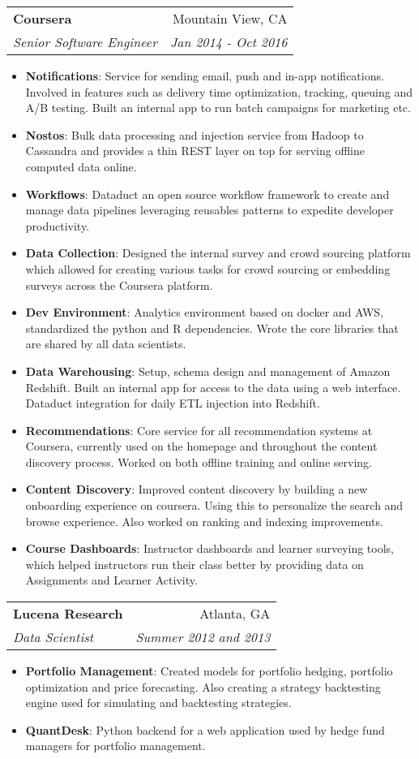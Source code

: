 \documentclass[letterpaper,11pt]{article}
\makeatletter
\newcommand{\resumeItem}[2]{
  \item\small{
    \textbf{#1}{: #2 \vspace{-2pt}}
  }
}
\newcommand{\resumeSubheading}[4]{
  \vspace{-1pt}\item
    \begin{tabular*}{0.97\textwidth}[t]{l@{\extracolsep{\fill}}r}
      \textbf{#1} & #2 \\
      \textit{\small#3} & \textit{\small #4} \\
    \end{tabular*}\vspace{-5pt}
}
\newcommand{\resumeItemListStart}{\begin{itemize}}
\newcommand{\resumeItemListEnd}{\end{itemize}\vspace{-5pt}}
\makeatother
\begin{document}
    \resumeSubheading
      {Coursera}{Mountain View, CA}
      {Senior Software Engineer}{Jan 2014 - Oct 2016}
      \resumeItemListStart
        \resumeItem{Notifications}
          {Service for sending email, push and in-app notifications. Involved in features such as delivery time optimization, tracking, queuing and A/B testing. Built an internal app to run batch campaigns for marketing etc.}
        \resumeItem{Nostos}
          {Bulk data processing and injection service from Hadoop to Cassandra and provides a thin REST layer on top for serving offline computed data online.}
        \resumeItem{Workflows}
          {Dataduct an open source workflow framework to create and manage data pipelines leveraging reusables patterns to expedite developer productivity.}
        \resumeItem{Data Collection}
          {Designed the internal survey and crowd sourcing platform which allowed for creating various tasks for crowd sourcing or embedding surveys across the Coursera platform.}
        \resumeItem{Dev Environment}
          {Analytics environment based on docker and AWS, standardized the python and R dependencies. Wrote the core libraries that are shared by all data scientists.}
        \resumeItem{Data Warehousing}
          {Setup, schema design and management of Amazon Redshift. Built an internal app for access to the data using a web interface. Dataduct integration for daily ETL injection into Redshift.}
        \resumeItem{Recommendations}
          {Core service for all recommendation systems at Coursera, currently used on the homepage and throughout the content discovery process. Worked on both offline training and online serving.}
        \resumeItem{Content Discovery}
          {Improved content discovery by building a new onboarding experience on coursera. Using this to personalize the search and browse experience. Also worked on ranking and indexing improvements.}
        \resumeItem{Course Dashboards}
          {Instructor dashboards and learner surveying tools, which helped instructors run their class better by providing data on Assignments and Learner Activity.}
      \resumeItemListEnd

    \resumeSubheading
      {Lucena Research}{Atlanta, GA}
      {Data Scientist}{Summer 2012 and 2013}
      \resumeItemListStart
        \resumeItem{Portfolio Management}
          {Created models for portfolio hedging,  portfolio optimization and price forecasting. Also creating a strategy backtesting engine used for simulating and backtesting strategies.}
        \resumeItem{QuantDesk}
          {Python backend for a web application used by hedge fund managers for portfolio management.}
      \resumeItemListEnd
\end{document}
